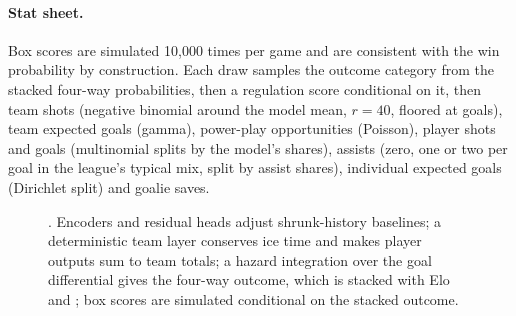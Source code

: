\paragraph{Stat sheet.}
Box scores are simulated 10,000 times per game and are consistent with the
win probability by construction. Each draw samples the outcome category from
the stacked four-way probabilities, then a regulation score conditional on it,
then team shots (negative binomial around the model mean, $r = 40$, floored at
goals), team expected goals (gamma), power-play opportunities (Poisson),
player shots and goals (multinomial splits by the model's shares), assists
(zero, one or two per goal in the league's typical mix, split by assist
shares), individual expected goals (Dirichlet split) and goalie saves.

\begin{figure}[t]
\centering

\caption{\neurhlG{}. Encoders and residual heads adjust shrunk-history baselines; a
deterministic team layer conserves ice time and makes player outputs sum to
team totals; a hazard integration over the goal differential gives the
four-way outcome, which is stacked with Elo and \neurhlH{}; box scores are
simulated conditional on the stacked outcome.}
\label{fig:g-arch}
\end{figure}
